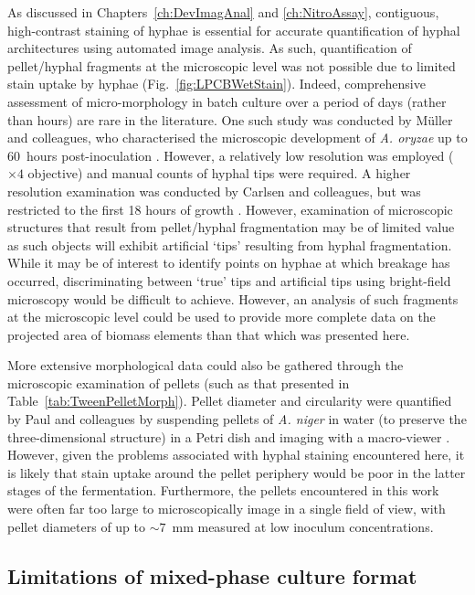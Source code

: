 As discussed in Chapters~\ref{ch:DevImagAnal} and \ref{ch:NitroAssay}, contiguous, high-contrast staining of hyphae is essential for accurate quantification of hyphal architectures using automated image analysis. As such, quantification of pellet/hyphal fragments at the microscopic level was not possible due to limited stain uptake by hyphae (Fig.~\ref{fig:LPCBWetStain}). Indeed, comprehensive assessment of micro-morphology in batch culture over a period of days (rather than hours) are rare in the literature. One such study was conducted by M\"{u}ller and colleagues, who characterised the microscopic development of \emph{A. oryzae} up to 60~hours post-inoculation \cite{muller2003}. However, a relatively low resolution was employed ($\times 4$ objective) and manual counts of hyphal tips were required. A higher resolution examination was conducted by Carlsen and colleagues, but was restricted to the first 18 hours of growth \cite{carlsen1996a}. However, examination of microscopic structures that result from pellet/hyphal fragmentation may be of limited value as such objects will exhibit artificial \lq tips' resulting from hyphal fragmentation. While it may be of interest to identify points on hyphae at which breakage has occurred, discriminating between \lq true' tips and artificial tips using bright-field microscopy would be difficult to achieve. However, an analysis of such fragments at the microscopic level could be used to provide more complete data on the projected area of biomass elements than that which was presented here.

More extensive morphological data could also be gathered through the microscopic examination of pellets (such as that presented in Table~\ref{tab:TweenPelletMorph}). Pellet diameter and circularity were quantified by Paul and colleagues by suspending pellets of \emph{A. niger} in water (to preserve the three-dimensional structure) in a Petri dish and imaging with a macro-viewer \cite{paul1999}. However, given the problems associated with hyphal staining encountered here, it is likely that stain uptake around the pellet periphery would be poor in the latter stages of the fermentation. Furthermore, the pellets encountered in this work were often far too large to microscopically image in a single field of view, with pellet diameters of up to $\sim 7$~mm measured at low inoculum concentrations.

\subsection{Limitations of mixed-phase culture format}

